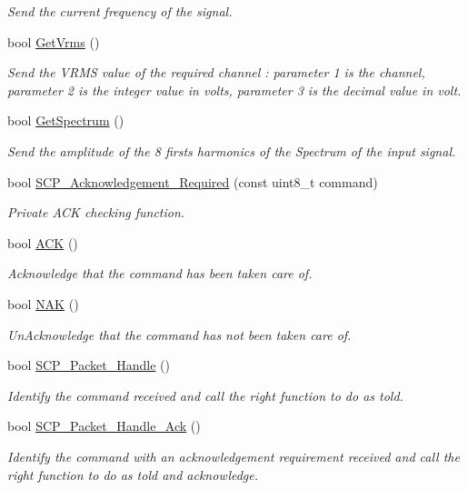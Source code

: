 \begin{DoxyCompactItemize}
\begin{DoxyCompactList}\small\item\em Send the current frequency of the signal. \end{DoxyCompactList}\item 
bool \hyperlink{group___s_c_p__module_ga4b2906757d866b1ffa1e9f12114c2c98}{Get\+Vrms} ()
\begin{DoxyCompactList}\small\item\em Send the V\+R\+M\+S value of the required channel \+: parameter 1 is the channel, parameter 2 is the integer value in volts, parameter 3 is the decimal value in volt. \end{DoxyCompactList}\item 
bool \hyperlink{group___s_c_p__module_gab384b45751d5c4b6bebd8339872eb637}{Get\+Spectrum} ()
\begin{DoxyCompactList}\small\item\em Send the amplitude of the 8 firsts harmonics of the Spectrum of the input signal. \end{DoxyCompactList}\item 
bool \hyperlink{group___s_c_p__module_gabc6a4b87b02de3d83d34127472211c9d}{S\+C\+P\+\_\+\+Acknowledgement\+\_\+\+Required} (const uint8\+\_\+t command)
\begin{DoxyCompactList}\small\item\em Private A\+C\+K checking function. \end{DoxyCompactList}\item 
bool \hyperlink{group___s_c_p__module_ga7928b6536c5cd2fa5deba5e4a15aabc4}{A\+C\+K} ()
\begin{DoxyCompactList}\small\item\em Acknowledge that the command has been taken care of. \end{DoxyCompactList}\item 
bool \hyperlink{group___s_c_p__module_ga84aa9cef78a0bfeec15dce98d521be73}{N\+A\+K} ()
\begin{DoxyCompactList}\small\item\em Un\+Acknowledge that the command has not been taken care of. \end{DoxyCompactList}\item 
bool \hyperlink{group___s_c_p__module_ga6667a17ea92e069382606d0210baf231}{S\+C\+P\+\_\+\+Packet\+\_\+\+Handle} ()
\begin{DoxyCompactList}\small\item\em Identify the command received and call the right function to do as told. \end{DoxyCompactList}\item 
bool \hyperlink{group___s_c_p__module_ga4daffa90d8a7df765394d5f1137157ed}{S\+C\+P\+\_\+\+Packet\+\_\+\+Handle\+\_\+\+Ack} ()
\begin{DoxyCompactList}\small\item\em Identify the command with an acknowledgement requirement received and call the right function to do as told and acknowledge. \end{DoxyCompactList}\end{DoxyCompactItemize}
